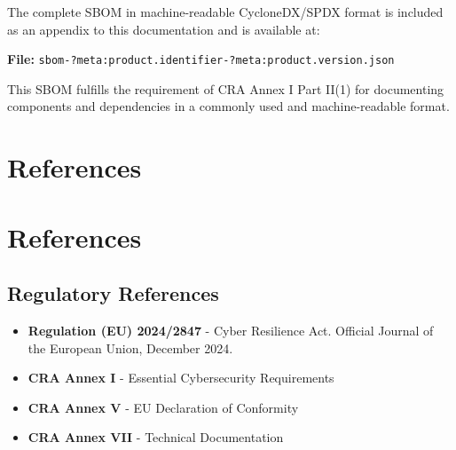 \documentclass[
  11 pt,
  a4paper,
  table]{report}
\providecommand{\tightlist}{%
  \setlength{\itemsep}{0pt}\setlength{\parskip}{0pt}}\usepackage{longtable,booktabs,array}
\begin{document}
The complete SBOM in machine-readable CycloneDX/SPDX format is included
as an appendix to this documentation and is available at:

\textbf{File:}
\texttt{sbom-?meta:product.identifier-?meta:product.version.json}

\begin{tcolorbox}[enhanced jigsaw, coltitle=black, bottomrule=.15mm, colback=white, leftrule=.75mm, opacitybacktitle=0.6, rightrule=.15mm, opacityback=0, arc=.35mm, toprule=.15mm, colframe=quarto-callout-note-color-frame, breakable, left=2mm, colbacktitle=quarto-callout-note-color!10!white, titlerule=0mm, bottomtitle=1mm, toptitle=1mm, title=\textcolor{quarto-callout-note-color}{\faInfo}\hspace{0.5em}{CRA Compliance}]

This SBOM fulfills the requirement of CRA Annex I Part II(1) for
documenting components and dependencies in a commonly used and
machine-readable format.

\end{tcolorbox}


\chapter{References}\label{references}


\chapter{References}\label{references-1}

\section{Regulatory References}\label{regulatory-references-1}

\begin{itemize}
\tightlist
\item
  \textbf{Regulation (EU) 2024/2847} - Cyber Resilience Act. Official
  Journal of the European Union, December 2024.
\item
  \textbf{CRA Annex I} - Essential Cybersecurity Requirements
\item
  \textbf{CRA Annex V} - EU Declaration of Conformity
\item
  \textbf{CRA Annex VII} - Technical Documentation
\end{itemize}
\end{document}
